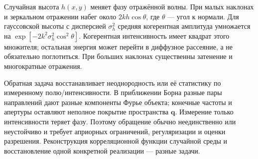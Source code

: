 
Случайная высота $h(x,y)$ меняет фазу отражённой волны. При малых наклонах и зеркальном отражении набег около $2kh\cos\theta$, где $\theta$ — угол к нормали. Для гауссовской высоты с дисперсией $\sigma_h^2$ средняя когерентная амплитуда умножается на $\exp[-2k^2\sigma_h^2\cos^2\theta]$. Когерентная интенсивность имеет квадрат этого множителя; остальная энергия может перейти в диффузное рассеяние, а не обязательно поглотиться. При больших наклонах существенны затенение и многократные отражения.

Обратная задача восстанавливает неоднородность или её статистику по измеренному полю/интенсивности. В приближении Борна разные пары направлений дают разные компоненты Фурье объекта; конечные частоты и апертуры оставляют неполное покрытие пространства $\bm q$. Измерение только интенсивности теряет фазу. Поэтому обращение обычно неединственно или неустойчиво и требует априорных ограничений, регуляризации и оценки разрешения. Реконструкция корреляционной функции случайной среды и восстановление одной конкретной реализации — разные задачи.
